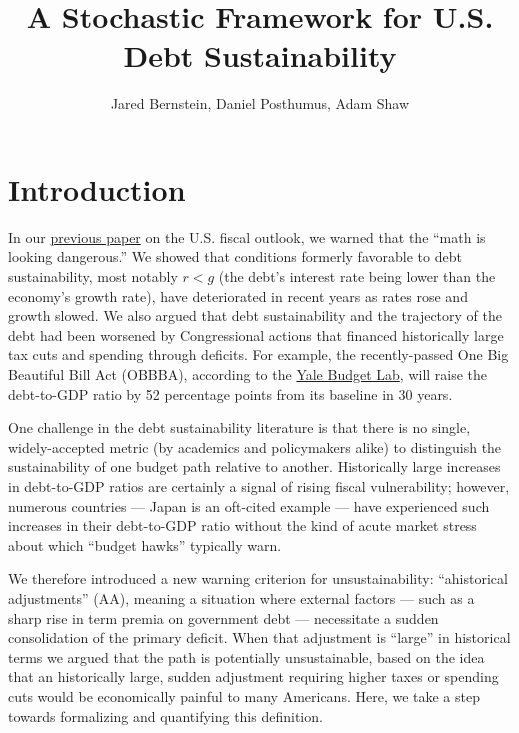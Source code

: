 \documentclass[12pt]{article}
\title{A Stochastic Framework for U.S. Debt Sustainability}
\author{Jared Bernstein, Daniel Posthumus, Adam Shaw}
\begin{document}
\maketitle

\section{Introduction}

In our \href{https://siepr.stanford.edu/publications/policy-brief/us-budget-math-looking-dangerous}{previous paper} on the U.S. fiscal outlook, we warned that the ``math is looking dangerous.'' We showed that conditions formerly favorable to debt sustainability, most notably $r < g$ (the debt's interest rate being lower than the economy's growth rate), have deteriorated in recent years as rates rose and growth slowed. We also argued that debt sustainability and the trajectory of the debt had been worsened by Congressional actions that financed historically large tax cuts and spending through deficits. For example, the recently-passed One Big Beautiful Bill Act (OBBBA), according to the \href{https://budgetlab.yale.edu/research/long-term-impacts-one-big-beautiful-bill-act-enacted-july-4-2025}{Yale Budget Lab}, will raise the debt-to-GDP ratio by 52 percentage points from its baseline in 30 years.

One challenge in the debt sustainability literature is that there is no single, widely-accepted metric (by academics and policymakers alike) to distinguish the sustainability of one budget path relative to another. Historically large increases in debt-to-GDP ratios are certainly a signal of rising fiscal vulnerability; however, numerous countries --- Japan is an oft-cited example --- have experienced such increases in their debt-to-GDP ratio without the kind of acute market stress about which ``budget hawks'' typically warn. 

We therefore introduced a new warning criterion for unsustainability: ``ahistorical adjustments'' (AA), meaning a situation where external factors --- such as a sharp rise in term premia on government debt --- necessitate a sudden consolidation of the primary deficit. When that adjustment is ``large'' in historical terms we argued that the path is potentially unsustainable, based on the idea that an historically large, sudden adjustment requiring higher taxes or spending cuts would be economically painful to many Americans. Here, we take a step towards formalizing and quantifying this definition.
\end{document}
